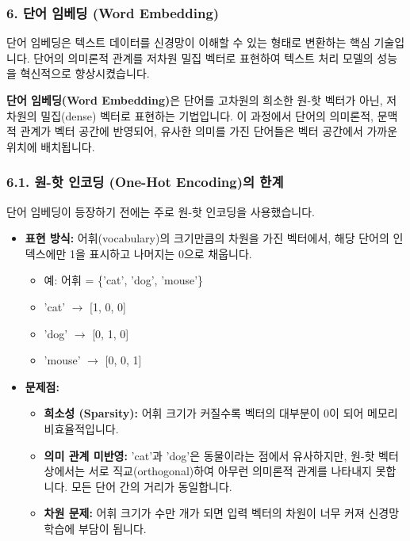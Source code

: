 \documentclass[11pt,a4paper]{article}
\begin{document}
\newpage
\subsubsection*{6. 단어 임베딩 (Word Embedding)}
단어 임베딩은 텍스트 데이터를 신경망이 이해할 수 있는 형태로 변환하는 핵심 기술입니다. 단어의 의미론적 관계를 저차원 밀집 벡터로 표현하여 텍스트 처리 모델의 성능을 혁신적으로 향상시켰습니다.

\begin{tcolorbox}[mybox, title=단어 임베딩의 개념]
\textbf{단어 임베딩(Word Embedding)}은 단어를 고차원의 희소한 원-핫 벡터가 아닌, 저차원의 밀집(dense) 벡터로 표현하는 기법입니다.
이 과정에서 단어의 의미론적, 문맥적 관계가 벡터 공간에 반영되어, 유사한 의미를 가진 단어들은 벡터 공간에서 가까운 위치에 배치됩니다.
\end{tcolorbox}

\subsubsection*{6.1. 원-핫 인코딩 (One-Hot Encoding)의 한계}
단어 임베딩이 등장하기 전에는 주로 원-핫 인코딩을 사용했습니다.

\begin{itemize}
    \item \textbf{표현 방식:} 어휘(vocabulary)의 크기만큼의 차원을 가진 벡터에서, 해당 단어의 인덱스에만 1을 표시하고 나머지는 0으로 채웁니다.
        \begin{itemize}
            \item 예: 어휘 = \{'cat', 'dog', 'mouse'\}
            \item 'cat' $\rightarrow$ [1, 0, 0]
            \item 'dog' $\rightarrow$ [0, 1, 0]
            \item 'mouse' $\rightarrow$ [0, 0, 1]
        \end{itemize}
    \item \textbf{문제점:}
    \begin{itemize}
        \item \textbf{희소성 (Sparsity):} 어휘 크기가 커질수록 벡터의 대부분이 0이 되어 메모리 비효율적입니다.
        \item \textbf{의미 관계 미반영:} 'cat'과 'dog'은 동물이라는 점에서 유사하지만, 원-핫 벡터 상에서는 서로 직교(orthogonal)하여 아무런 의미론적 관계를 나타내지 못합니다. 모든 단어 간의 거리가 동일합니다.
        \item \textbf{차원 문제:} 어휘 크기가 수만 개가 되면 입력 벡터의 차원이 너무 커져 신경망 학습에 부담이 됩니다.
    \end{itemize}
\end{itemize}
\end{document}
